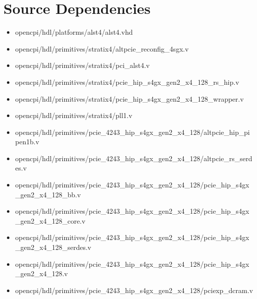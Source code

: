 \documentclass{article}
\begin{document}
\section*{Source Dependencies}
\begin{itemize}
	\item
opencpi/hdl/platforms/alst4/alst4.vhd
	\item
opencpi/hdl/primitives/stratix4/altpcie\_reconfig\_4sgx.v
	\item
opencpi/hdl/primitives/stratix4/pci\_alst4.v
	\item
opencpi/hdl/primitives/stratix4/pcie\_hip\_s4gx\_gen2\_x4\_128\_rs\_hip.v
	\item
opencpi/hdl/primitives/stratix4/pcie\_hip\_s4gx\_gen2\_x4\_128\_wrapper.v
	\item
opencpi/hdl/primitives/stratix4/pll1.v
	\item
opencpi/hdl/primitives/pcie\_4243\_hip\_s4gx\_gen2\_x4\_128/altpcie\_hip\_pipen1b.v
	\item
opencpi/hdl/primitives/pcie\_4243\_hip\_s4gx\_gen2\_x4\_128/altpcie\_rs\_serdes.v
	\item
opencpi/hdl/primitives/pcie\_4243\_hip\_s4gx\_gen2\_x4\_128/pcie\_hip\_s4gx\_gen2\_x4\_128\_bb.v
	\item
opencpi/hdl/primitives/pcie\_4243\_hip\_s4gx\_gen2\_x4\_128/pcie\_hip\_s4gx\_gen2\_x4\_128\_core.v
	\item
opencpi/hdl/primitives/pcie\_4243\_hip\_s4gx\_gen2\_x4\_128/pcie\_hip\_s4gx\_gen2\_x4\_128\_serdes.v
	\item
opencpi/hdl/primitives/pcie\_4243\_hip\_s4gx\_gen2\_x4\_128/pcie\_hip\_s4gx\_gen2\_x4\_128.v
	\item
opencpi/hdl/primitives/pcie\_4243\_hip\_s4gx\_gen2\_x4\_128/pciexp\_dcram.v
\end{itemize}
\end{document}
